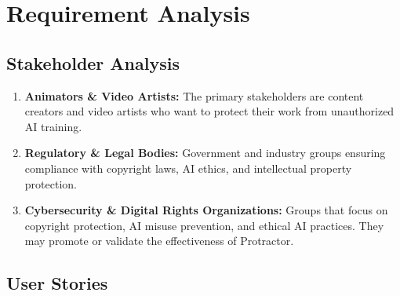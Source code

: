 
\newcommand{\userstory}[4]{%
    \refstepcounter{nuserstory}
    \subsection{#1}
    \label{userstory:\thenuserstory}
    \hangindent=40pt
    \textbf{\textit{As a}} #2,\\
    \textbf{\textit{I want to}} #3,\\
    \textbf{\textit{so that}} #4.
}
\newenvironment{usecase}[1]
{
    \refstepcounter{nusecase}%
    \subsection{Use Case \thenusecase: #1}%
    \label{usecase:\thenusecase}%
}{}

\chapter{Requirement Analysis}
\label{chap:requirement-analysis}

\section{Stakeholder Analysis}
\label{section:stakeholder-analysis}

\begin{enumerate}[leftmargin=80pt]
    \item \textbf{Animators \& Video Artists:} The primary stakeholders are content creators and 
    video artists who want to protect their work from unauthorized AI training.
    \item \textbf{Regulatory \& Legal Bodies:} Government and industry groups ensuring 
    compliance with copyright laws, AI ethics, and intellectual property protection.
    \item \textbf{Cybersecurity \& Digital Rights Organizations:} Groups that focus on copyright protection, 
    AI misuse prevention, and ethical AI practices. They may promote or validate the effectiveness of Protractor.

\end{enumerate}

\section{User Stories}
\label{section:user-stories}

